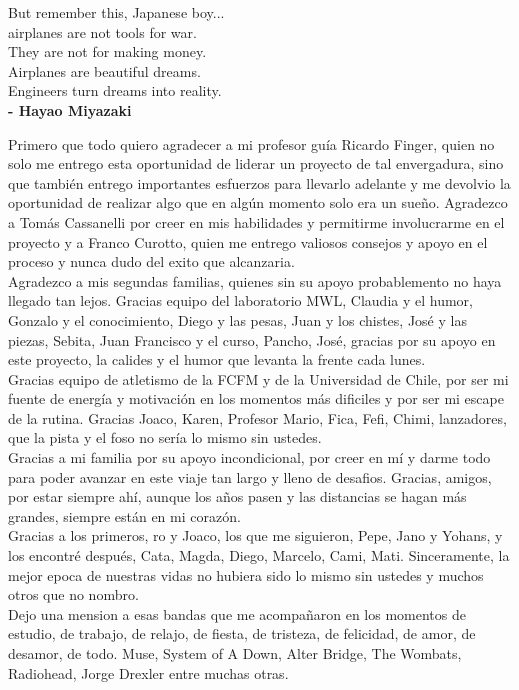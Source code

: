 \documentclass[
	spanish, %
	letterpaper, oneside
]{book}
\begin{document}
\begin{dedicatory}
	But remember this, Japanese boy...\\
	airplanes are not tools for war.\\
	They are not for making money.\\ 
	Airplanes are beautiful dreams. \\
	Engineers turn dreams into reality.\\

	\textbf{- Hayao Miyazaki}
\end{dedicatory}

\begin{acknowledgments}
	Primero que todo quiero agradecer a mi profesor guía Ricardo Finger, quien no solo me entrego esta oportunidad de liderar un proyecto de tal envergadura, sino que también entrego importantes esfuerzos para llevarlo adelante y me devolvio la oportunidad de realizar algo que en algún momento solo era un sueño. Agradezco a Tomás Cassanelli por creer en mis habilidades y permitirme involucrarme en el proyecto y a Franco Curotto, quien me entrego valiosos consejos y apoyo en el proceso y nunca dudo del exito que alcanzaria.\\

	Agradezco a mis segundas familias, quienes sin su apoyo probablemento no haya llegado tan lejos. Gracias equipo del laboratorio MWL, Claudia y el humor, Gonzalo y el conocimiento, Diego y las pesas, Juan y los chistes, José y las piezas, Sebita, Juan Francisco y el curso, Pancho, José, gracias por su apoyo en este proyecto, la calides y el humor que levanta la frente cada lunes.\\

	Gracias equipo de atletismo de la FCFM y de la Universidad de Chile, por ser mi fuente de energía y motivación en los momentos más dificiles y por ser mi escape de la rutina. Gracias Joaco, Karen, Profesor Mario, Fica, Fefi, Chimi, lanzadores, que la pista y el foso no sería lo mismo sin ustedes.\\

	Gracias a mi familia por su apoyo incondicional, por creer en mí y darme todo para poder avanzar en este viaje tan largo y lleno de desafios. Gracias, amigos, por estar siempre ahí, aunque los años pasen y las distancias se hagan más grandes, siempre están en mi corazón.\\

	Gracias a los primeros, ro y Joaco, los que me siguieron, Pepe, Jano y Yohans, y los encontré después, Cata, Magda, Diego, Marcelo, Cami, Mati. Sinceramente, la mejor epoca de nuestras vidas no hubiera sido lo mismo sin ustedes y muchos otros que no nombro.\\

	Dejo una mension a esas bandas que me acompañaron en los momentos de estudio, de trabajo, de relajo, de fiesta, de tristeza, de felicidad, de amor, de desamor, de todo. Muse, System of A Down, Alter Bridge, The Wombats, Radiohead, Jorge Drexler entre muchas otras.\\
\end{acknowledgments}
\end{document}
